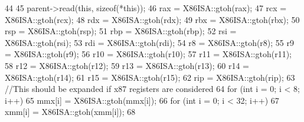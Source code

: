 \begin{DoxyCode}
44 {
45     parent->read(this, sizeof(*this));
46     rax = X86ISA::gtoh(rax);
47     rcx = X86ISA::gtoh(rcx);
48     rdx = X86ISA::gtoh(rdx);
49     rbx = X86ISA::gtoh(rbx);
50     rsp = X86ISA::gtoh(rsp);
51     rbp = X86ISA::gtoh(rbp);
52     rsi = X86ISA::gtoh(rsi);
53     rdi = X86ISA::gtoh(rdi);
54     r8 = X86ISA::gtoh(r8);
55     r9 = X86ISA::gtoh(r9);
56     r10 = X86ISA::gtoh(r10);
57     r11 = X86ISA::gtoh(r11);
58     r12 = X86ISA::gtoh(r12);
59     r13 = X86ISA::gtoh(r13);
60     r14 = X86ISA::gtoh(r14);
61     r15 = X86ISA::gtoh(r15);
62     rip = X86ISA::gtoh(rip);
63     //This should be expanded if x87 registers are considered
64     for (int i = 0; i < 8; i++)
65         mmx[i] = X86ISA::gtoh(mmx[i]);
66     for (int i = 0; i < 32; i++)
67         xmm[i] = X86ISA::gtoh(xmm[i]);
68 }
\end{DoxyCode}



